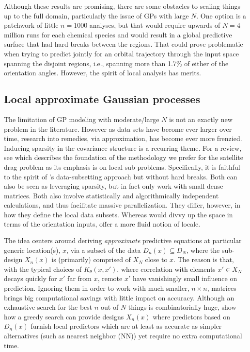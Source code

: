 \documentclass[12pt]{article}
\begin{document}
Although these results are promising, there are some obstacles to scaling
things up to the full domain, particularly the issue of GPs with large $N$.
One option is a patchwork of little-$n=1000$ analyses, but that would require
upwards of $N=4$ million runs for each chemical species and would result in a
global predictive surface that had hard breaks between the regions.  That
could prove problematic when trying to predict jointly for an orbital trajectory through the input
space spanning the disjoint regions, i.e., spanning more than 1.7\% of either
of the orientation angles.  However, the spirit of local analysis has merits.

\subsection{Local approximate Gaussian processes}
\label{sec:laGP}

The limitation of GP modeling with moderate/large $N$ is not an exactly
new problem in the literature.  However as data sets have become ever larger
over time, research into remedies, via approximation, has become ever more
frenzied. Inducing sparsity in the covariance structure is a recurring theme.
For a review, see \cite{gramacy:apley:2015} which describes the foundation of
the methodology we prefer for the satellite drag problem as its emphasis is on
local sub-problems.  Specifically, it is faithful to the spirit of
\citet{metha:etal:2014}'s data-subsetting approach but without hard
breaks. Both can also be seen as leveraging sparsity, but in fact only work
with small dense matrices. Both also involve statistically and algorithmically
independent calculations, and thus facilitate massive parallelization. They
differ, however, in how they define the local data subsets.  Whereas
\citet{metha:etal:2014} would divvy up the space in terms of the
orientation inputs, \citeauthor{gramacy:apley:2015} offer a more fluid notion
of locale.

The idea centers around deriving {\em approximate} predictive equations at
particular generic location(s), $x$, via a subset of the data $D_n(x)
\subseteq D_N$, where the sub-design $X_n(x)$ is (primarily) comprised of
$X_N$ close to $x$. The reason is that, with the
typical choices of $K_\theta(x, x')$, where correlation with elements $x' \in
X_N$ decays quickly for $x'$ far from $x$, remote $x'$ have vanishingly small
influence on prediction.  Ignoring them in order to work with much smaller,
$n\times n$, matrices brings big computational savings
with little impact on accuracy. Although an exhaustive search for the best $n$
out of $N$ things is combinatorially huge, \citeauthor{gramacy:apley:2015}
show how a greedy search can provide designs $X_n(x)$ where predictors based
on $D_n(x)$ furnish local predictors which are at least as accurate as simpler
alternatives (such as nearest neighbor (NN)) yet require no extra computational
time.
\end{document}
